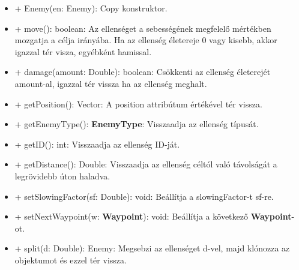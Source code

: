 \begin{itemize}
\begin{itemize}
		\item + Enemy(en: Enemy): Copy konstruktor.
		\item + move(): boolean: Az ellenséget a sebességének megfelelő mértékben mozgatja a célja irányába. Ha az ellenség életereje 0 vagy kisebb, akkor igazzal tér visza, egyébként hamissal.
		\item + damage(amount: Double): boolean: Csökkenti az ellenség életerejét amount-al, igazzal tér vissza ha az ellenség meghalt.
		\item + getPosition(): Vector: A position attribútum értékével tér vissza.
		\item + getEnemyType(): \textbf{EnemyType}: Visszaadja az ellenség típusát.
		\item + getID(): int: Visszaadja az ellenség ID-ját.
		\item + getDistance(): Double: Visszaadja az ellenség céltól való távolságát a legrövidebb úton haladva.
		\item + setSlowingFactor(sf: Double): void: Beállítja a slowingFactor-t sf-re.
		\item + setNextWaypoint(w: \textbf{Waypoint}): void: Beállítja a következő \textbf{Waypoint}-ot.
		\item + split(d: Double): Enemy: Megsebzi az ellenséget d-vel, majd klónozza az objektumot és ezzel tér vissza.
	\end{itemize}
\end{itemize}


